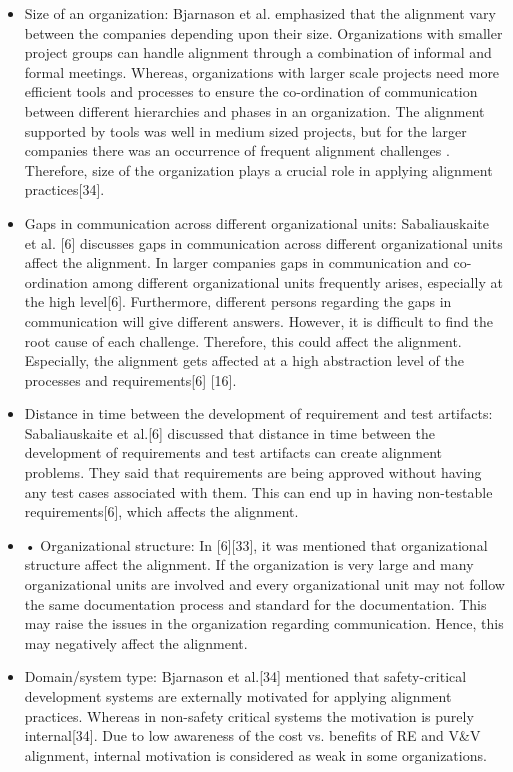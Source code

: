 \documentclass{article}
\begin{document}
\begin{itemize}
    \item Size of an organization: Bjarnason et al. \cite{bjarnason2014challenges} emphasized that the alignment vary between the companies depending upon their size. Organizations with smaller project groups can handle alignment through a combination of informal and formal meetings. Whereas, organizations with larger scale projects need more efficient tools and processes to ensure the co-ordination of communication between different hierarchies and phases in an organization\cite{bjarnason2014challenges}. The alignment supported by tools was well in medium sized projects, but for the larger companies there was an occurrence of frequent alignment challenges \cite{kukkanen2009applying}. Therefore, size of the organization plays a crucial role in applying alignment practices[34].
    \item Gaps in communication across different organizational units: Sabaliauskaite et al. [6] discusses gaps in communication across different organizational units affect the alignment. In larger companies gaps in communication and co-ordination among different organizational units frequently arises, especially at the high level[6]. Furthermore, different persons regarding the gaps in communication will give different answers. However, it is difficult to find the root cause of each challenge. Therefore, this could affect the alignment. Especially, the alignment gets affected at a high abstraction level of the processes and requirements[6] [16].
    \item Distance in time between the development of requirement and test artifacts: Sabaliauskaite et al.[6] discussed that distance in time between the development of requirements and test artifacts can create alignment problems. They said that requirements are being approved without having any test cases associated with them. This can end up in having non-testable requirements[6], which affects the alignment. 
    \item •	Organizational structure: In [6]\cite{bjarnason2014challenges}[33], it was mentioned that organizational structure affect the alignment. If the organization is very large and many organizational units are involved and every organizational unit may not follow the same documentation process and standard for the documentation. This may raise the issues in the organization regarding communication. Hence, this may negatively affect the alignment.
    \item Domain/system type: Bjarnason et al.[34] mentioned that safety-critical development systems are externally motivated for applying alignment practices. Whereas in non-safety critical systems the motivation is purely internal[34]. Due to low awareness of the cost vs. benefits of RE and V&V alignment, internal motivation is considered as weak in some organizations.
\end{itemize}
\end{document}
